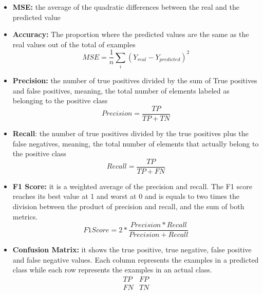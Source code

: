 \begin{itemize}
\item \textbf{MSE:} the average of the quadratic differences between the real and the predicted value
\item \textbf{Accuracy:} The proportion where the predicted values are the same as the real values out of the total of examples
\begin{equation}
MSE=\frac{1}{n}\sum_i (Y_{real}-Y_{predicted})^2
\label{eq:msemet}
\end{equation}
\item \textbf{Precision:} the number of true positives divided by the sum of True positives and false positives, meaning, the total number of elements labeled as belonging to the positive class 
\begin{equation}
Precision=\frac{TP}{TP+TN}
\label{eq:precision}
\end{equation}
\item \textbf{Recall}: the number of true positives divided by the true positives plus the false negatives, meaning, the total number of elements that actually belong to the positive class
\begin{equation}
Recall=\frac{TP}{TP+FN}
\label{eq:recall}
\end{equation}
\item \textbf{F1 Score:} it is a weighted average of the precision and recall. The F1 score reaches its best value at 1 and worst at 0 and is equals to two times the division between the product of precision and recall, and the sum of both metrics.
\begin{equation}
F1 Score=2*\frac{Precision*Recall}{Precision+Recall}
\label{eq:fiscore}
\end{equation}
\item \textbf{Confusion Matrix:} it shows the true positive, true negative, false positive and false negative values. Each column represents the examples in a predicted class while each row represents the examples in an actual class.
$$
\begin{matrix}
TP&FP\\
FN&TN\\
\end{matrix}
$$
\end{itemize}

























